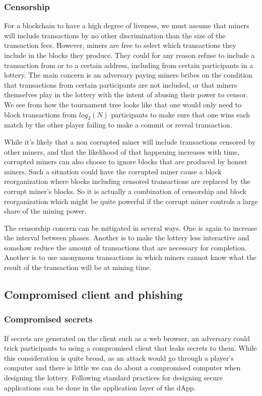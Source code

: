 \subsubsection{Censorship}
For a blockchain to have a high degree of liveness, we must assume that miners will include transactions by no other discrimination than the size of the transaction fees. However, miners are free to select which transactions they include in the blocks they produce. They could for any reason refuse to include a transaction from or to a certain address, including from certain participants in a lottery. The main concern is an adversary paying miners bribes on the condition that transactions from certain participants are not included, or that miners themselves play in the lottery with the intent of abusing their power to censor. We see from how the tournament tree looks like that one would only need to block transactions from $log_2(N)$ participants to make sure that one wins each match by the other player failing to make a commit or reveal transaction. 

While it's likely that a non corrupted miner will include transactions censored by other miners, and that the likelihood of that happening increases with time, corrupted miners can also choose to ignore blocks that are produced by honest miners. Such a situation could have the corrupted miner cause a block reorganization where blocks including censored transactions are replaced by the corrupt miner's blocks. So it is actually a combination of censorship and block reorganization which might be quite powerful if the corrupt miner controls a large share of the mining power.

The censorship concern can be mitigated in several ways. One is again to increase the interval between phases. Another is to make the lottery less interactive and somehow reduce the amount of transactions that are necessary for completion. Another is to use anonymous transactions in which miners cannot know what the result of the transaction will be at mining time.

\subsection{Compromised client and phishing}

\subsubsection{Compromised secrets}
If secrets are generated on the client such as a web browser, an adversary could trick participants to using a compromised client that leaks secrets to them. While this consideration is quite broad, as an attack would go through a player's computer and there is little we can do about a compromised computer when designing the lottery. Following standard practices for designing secure applications can be done in the application layer of the dApp.

